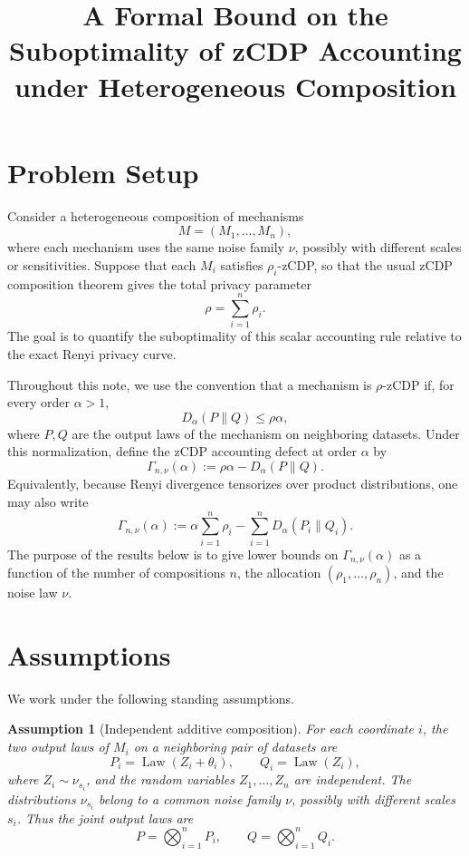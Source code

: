 \documentclass[11pt]{article}
\title{A Formal Bound on the Suboptimality of zCDP Accounting under Heterogeneous Composition}
\author{}
\date{}
\newtheorem{assumption}{Assumption}
\newcommand{\Law}{\operatorname{Law}}
\begin{document}
\maketitle

\section{Problem Setup}

Consider a heterogeneous composition of mechanisms
\[
M=(M_1,\dots,M_n),
\]
where each mechanism uses the same noise family \(\nu\), possibly with different
scales or sensitivities. Suppose that each \(M_i\) satisfies \(\rho_i\)-zCDP, so
that the usual zCDP composition theorem gives the total privacy parameter
\[
\rho=\sum_{i=1}^n \rho_i.
\]
The goal is to quantify the suboptimality of this scalar accounting rule relative
to the exact Renyi privacy curve.

Throughout this note, we use the convention that a mechanism is \(\rho\)-zCDP if,
for every order \(\alpha>1\),
\[
D_\alpha(P\|Q)\le \rho\alpha,
\]
where \(P,Q\) are the output laws of the mechanism on neighboring datasets.
Under this normalization, define the zCDP accounting defect at order \(\alpha\) by
\[
\Gamma_{n,\nu}(\alpha)
:=
\rho\alpha-D_\alpha(P\|Q).
\]
Equivalently, because Renyi divergence tensorizes over product distributions, one
may also write
\[
\Gamma_{n,\nu}(\alpha)
:=
\alpha\sum_{i=1}^n\rho_i-
\sum_{i=1}^n D_\alpha(P_i\|Q_i).
\]
The purpose of the results below is to give lower bounds on
\(\Gamma_{n,\nu}(\alpha)\) as a function of the number of compositions \(n\), the
allocation \((\rho_1,\dots,\rho_n)\), and the noise law \(\nu\).

\section{Assumptions}

We work under the following standing assumptions.

\begin{assumption}[Independent additive composition]
\label{ass:additive-composition}
For each coordinate \(i\), the two output laws of \(M_i\) on a neighboring pair of
datasets are
\[
P_i=\Law(Z_i+\theta_i),
\qquad
Q_i=\Law(Z_i),
\]
where \(Z_i\sim \nu_{s_i}\), and the random variables \(Z_1,\dots,Z_n\) are
independent. The distributions \(\nu_{s_i}\) belong to a common noise family
\(\nu\), possibly with different scales \(s_i\). Thus the joint output laws are
\[
P=\bigotimes_{i=1}^n P_i,
\qquad
Q=\bigotimes_{i=1}^n Q_i.
\]
\end{assumption}
\end{document}
